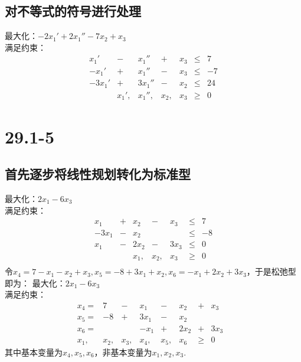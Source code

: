 \documentclass[twocolumn]{article}
\newenvironment{SChinese}{%
	\CJKfamily{gbsn}%
	\CJKtilde
	\CJKnospace}{}
\begin{document}
\begin{CJK}{UTF8}{}
\begin{SChinese}
				\subsection*{对不等式的符号进行处理}
				最大化：$-2x_1'+2x_1''-7x_2+x_3$\\
				满足约束：\begin{displaymath}
				\begin{matrix}
				x_1' & - & x_1'' & + & x_3 & \le & 7 \\
				-x_1' & + & x_1'' & - & x_3 & \le & -7 \\
				-3x_1' & + & 3x_1'' & - & x_2 & \le & 24 \\
				& x_1', & x_1'', & x_2, & x_3 & \ge & 0 
				\end{matrix}
				\end{displaymath}
			\section*{29.1-5}
				\subsection*{首先逐步将线性规划转化为标准型}
				最大化：$2x_1-6x_3$\\
				满足约束：\begin{displaymath}
				\begin{matrix}
				x_1 & + & x_2 & - & x_3 & \le & 7 \\
				-3x_1 & - & x_2 &  &  & \le & -8 \\
				x_1 & - & 2x_2 & - & 3x_3 & \le & 0 \\
				&  & x_1, & x_2, & x_3 & \ge &  0 \\
				\end{matrix}
				\end{displaymath}
				令$x_4 = 7-x_1-x_2+x_3,x_5=-8+3x_1+x_2,x_6=-x_1+2x_2+3x_3$，于是松弛型即为：
				最大化：$2x_1-6x_3$\\
				满足约束：\begin{displaymath}
				\begin{matrix}
				x_4= & 7 & - & x_1 & - & x_2 & + & x_3\\
				x_5= & -8 & + & 3x_1 & - & x_2 &\\
				x_6= &   &   & -x_1 & + & 2x_2 & + & 3x_3 &\\
				x_1, & x_2, & x_3, & x_4, & x_5, & x_6 & \ge & 0
				\end{matrix}
				\end{displaymath}
				其中基本变量为$x_4,x_5,x_6$，非基本变量为$x_1,x_2,x_3$.

\end{SChinese}
\end{CJK}
\end{document}
